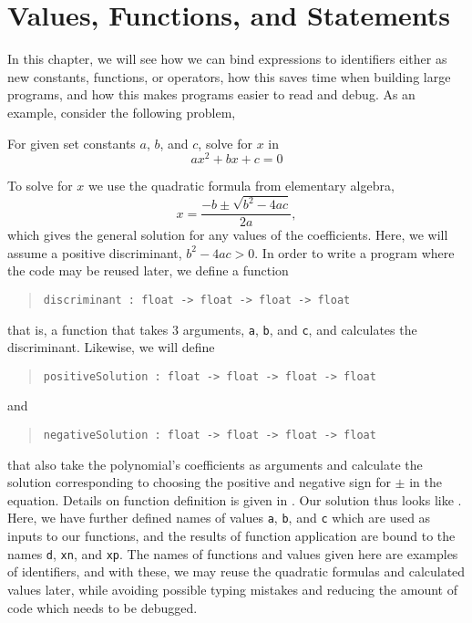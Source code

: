 \documentclass[springer.tex]{subfiles}
\begin{document}
\chapter{Values, Functions, and Statements}
\label{chap:let}
%
In this chapter, we will see how we can bind expressions to identifiers either as new constants, functions, or operators, how this saves time when building large programs, and how this makes programs easier to read and debug. As an example, consider the following problem,
\begin{task}
  For given set constants $a$, $b$, and $c$, solve for $x$ in
  \begin{equation}
  a x^2+bx+c = 0
\end{equation}
\end{task}
To solve for $x$ we use the quadratic formula from elementary algebra,
\begin{equation}
  x = \frac{-b\pm\sqrt{b^2-4ac}}{2a},
\end{equation}
which gives the general solution for any values of the coefficients. Here, we will assume a positive discriminant, $b^2-4ac>0$. In order to write a program where the code may be reused later, we define a function
\begin{quote}
  \lstinline!discriminant : float -> float -> float -> float!
\end{quote}
that is, a function that takes 3 arguments, \lstinline!a!, \lstinline!b!, and \lstinline!c!, and calculates the discriminant. Likewise, we will define
\begin{quote}
  \lstinline!positiveSolution : float -> float -> float -> float!
\end{quote}
and
\begin{quote}
  \lstinline!negativeSolution : float -> float -> float -> float!
\end{quote}
that also take the polynomial's coefficients as arguments and calculate the solution corresponding to choosing the positive and negative sign for $\pm$ in the equation. Details on function definition is given in . Our solution thus looks like .
%
%
Here, we have further defined names of values \lstinline!a!, \lstinline!b!, and \lstinline!c! which are used as inputs to our functions, and the results of function application are bound to the names \lstinline!d!, \lstinline!xn!, and \lstinline!xp!. The names of functions and values given here are examples of identifiers, and with these, we may reuse the quadratic formulas and calculated values later, while avoiding possible typing mistakes and reducing the amount of code which needs to be debugged.
\end{document}
